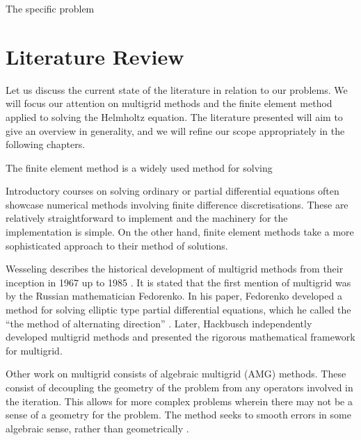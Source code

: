 The specific problem 




\section{Literature Review}

\iffalse

Topics to cover:
	Solving Poisson problem
	Solving Helmholtz
	Complex shifted laplacian
	Multigrid
	Cylindrical coordinates

Mention one or two references for each, try and reach >2 pages.

\fi

Let us discuss the current state of the literature in relation to our problems.
We will focus our attention on multigrid methods and the finite element method applied to solving the Helmholtz equation.
The literature presented will aim to give an overview in generality, and we will refine our scope appropriately in the following chapters.


The finite element method is a widely used method for solving

Introductory courses on solving ordinary or partial differential equations often showcase numerical methods involving finite difference discretisations.
These are relatively straightforward to implement and the machinery for the implementation is simple.
On the other hand, finite element methods take a more sophisticated approach to their method of solutions.


Wesseling describes the historical development of multigrid methods from their inception in 1967 up to 1985 \cite{wesseling}.
It is stated that the first mention of multigrid was by the Russian mathematician Fedorenko.
In his paper, Fedorenko developed a method for solving elliptic type partial differential equations, which he called the ``the method of alternating direction'' \cite{fedorenko}.
Later, Hackbusch independently developed multigrid methods and presented the rigorous mathematical framework for multigrid.

Other work on multigrid consists of algebraic multigrid (AMG) methods.
These consist of decoupling the geometry of the problem from any operators involved in the iteration.
This allows for more complex problems wherein there may not be a sense of a geometry for the problem.
The method seeks to smooth errors in some algebraic sense, rather than geometrically \cite{briggs}.

